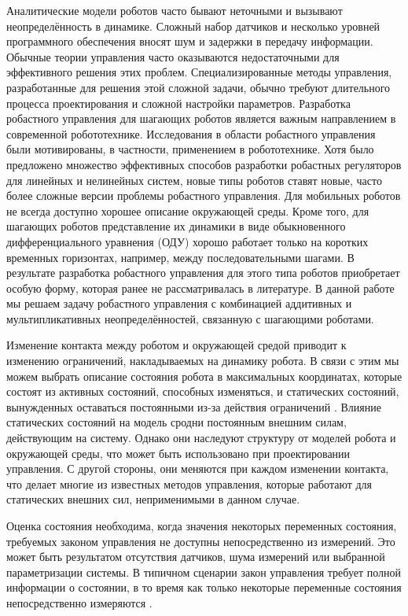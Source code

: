 Аналитические модели роботов часто бывают неточными и вызывают неопределённость в динамике. Сложный набор датчиков и несколько уровней программного обеспечения вносят шум и задержки в передачу информации. Обычные теории управления часто оказываются недостаточными для эффективного решения этих проблем. Специализированные методы управления, разработанные для решения этой сложной задачи, обычно требуют длительного процесса проектирования и сложной настройки параметров. Разработка робастного управления для шагающих роботов является важным направлением в современной робототехнике. Исследования в области робастного управления были мотивированы, в частности, применением в робототехнике. Хотя было предложено множество эффективных способов разработки робастных регуляторов для линейных \cite{POLYAK2021,Nicolett2018} и нелинейных \cite{HAUSWIRTH2024,Celentano2018} систем, новые типы роботов ставят новые, часто более сложные версии проблемы робастного управления. Для мобильных роботов не всегда доступно хорошее описание окружающей среды. Кроме того, для шагающих роботов представление их динамики в виде обыкновенного дифференциального уравнения (ОДУ) хорошо работает только на коротких временных горизонтах, например, между последовательными шагами. В результате разработка робастного управления для этого типа роботов приобретает особую форму, которая ранее не рассматривалась в литературе. В данной работе мы решаем задачу робастного управления с комбинацией аддитивных и мультипликативных неопределённостей, связанную с шагающими роботами.

Изменение контакта между роботом и окружающей средой приводит к изменению ограничений, накладываемых на динамику робота. В связи с этим мы можем выбрать описание состояния робота в максимальных координатах, которые состоят из активных состояний, способных изменяться, и статических состояний, вынужденных оставаться постоянными из-за действия ограничений \cite{SAVIN2021}. Влияние статических состояний на модель сродни постоянным внешним силам, действующим на систему. Однако они наследуют структуру от моделей робота и окружающей среды, что может быть использовано при проектировании управления. С другой стороны, они меняются при каждом изменении контакта, что делает многие из известных методов управления, которые работают для статических внешних сил, неприменимыми в данном случае.

Оценка состояния необходима, когда значения некоторых переменных состояния, требуемых законом управления не доступны непосредственно из измерений. Это может быть результатом отсутствия датчиков, шума измерений или выбранной параметризации системы. В типичном сценарии закон управления требует полной информации о состоянии, в то время как только некоторые переменные состояния непосредственно измеряются \cite{Ackermann2001}.

